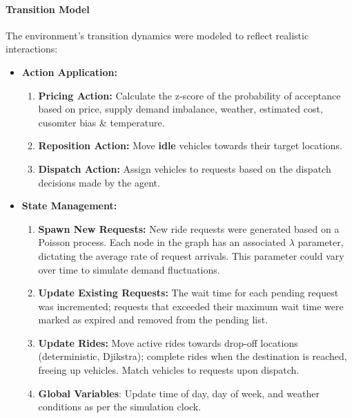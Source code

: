 \documentclass[11pt]{article}
\begin{document}
\paragraph{Transition Model} The environment's transition dynamics were modeled to reflect realistic interactions:
\begin{itemize}
		\item \textbf{Action Application:}
				\begin{enumerate}
						\item \textbf{Pricing Action:} Calculate the z-score of the probability of acceptance based on price,
								supply demand imbalance, weather, estimated cost, cusomter bias \& temperature.
						\item \textbf{Reposition Action:} Move \textbf{idle} vehicles towards their target locations.
						\item \textbf{Dispatch Action:} Assign vehicles to requests based on the dispatch decisions made by the agent.
				\end{enumerate}
		\item \textbf{State Management:}
				\begin{enumerate}
						\item \textbf{Spawn New Requests:} New ride requests were generated based on a Poisson process. Each
								node in the graph has an associated $\lambda$ parameter, dictating the average rate of request
								arrivals. This parameter could vary over time to simulate demand fluctuations.
						\item \textbf{Update Existing Requests:} The wait time for each pending request was incremented;
								requests that exceeded their maximum wait time were marked as expired and removed from the pending list.
						\item \textbf{Update Rides:} Move active rides towards drop-off locations (deterministic, Djikstra);
								complete rides when the destination is reached, freeing up vehicles. Match vehicles to requests upon dispatch.
						\item \textbf{Global Variables}: Update time of day, day of week, and weather conditions as per the
								simulation clock.
				\end{enumerate}
\end{itemize}
\end{document}
